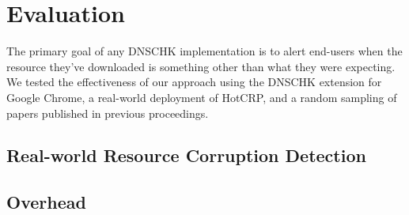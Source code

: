 \section{Evaluation} \label{sec:evaluation}

The primary goal of any DNSCHK implementation is to alert end-users when the
resource they've downloaded is something other than what they were expecting. We
tested the effectiveness of our approach using the DNSCHK extension for Google
Chrome, a real-world deployment of HotCRP, and a random sampling of papers
published in previous \CONFERENCE{} proceedings.


\subsection{Real-world Resource Corruption Detection}


\subsection{Overhead}

